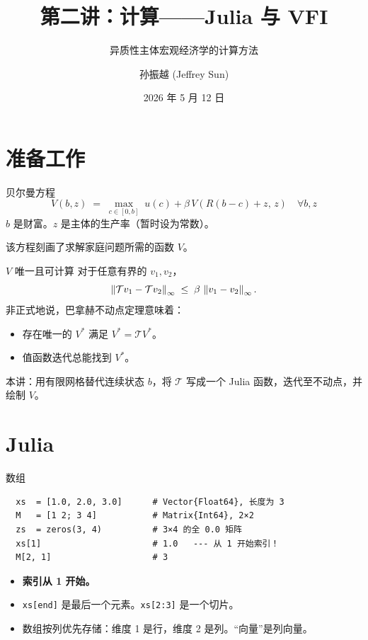 \documentclass[10pt,aspectratio=169]{beamer}
\title{第二讲：计算——Julia 与 VFI}
\subtitle{异质性主体宏观经济学的计算方法}
\author{孙振越 (Jeffrey Sun)}
\institute{多伦多大学}
\date{2026 年 5 月 12 日}
\begin{document}
\maketitle

\section{准备工作}

\begin{frame}{贝尔曼方程}
  \[
    \boxed{\;
      V(b, z) \;=\; \max_{c \in [0, b]} \; u(c)
        + \beta \, V(R(b-c) + z,\, z)\quad\forall b,z
    \;}
  \]
  $b$ 是财富。$z$ 是主体的生产率（暂时设为常数）。

  该方程刻画了求解家庭问题所需的函数 $V$。
\end{frame}

\begin{frame}{$V$ 唯一且可计算}
  对于任意有界的 $v_1, v_2$，
  \[
    \left\| \mathcal{T} v_1 - \mathcal{T} v_2 \right\|_\infty
      \;\le\; \beta \, \left\| v_1 - v_2 \right\|_\infty.
  \]
  非正式地说，巴拿赫不动点定理意味着：
  \begin{itemize}
    \item 存在唯一的 $V^*$ 满足 $V^* = \mathcal{T} V^*$。
    \item 值函数迭代总能找到 $V^*$。
  \end{itemize}
  本讲：用有限网格替代连续状态 $b$，将 $\mathcal{T}$ 写成一个 Julia 函数，迭代至不动点，并绘制 $V$。
\end{frame}

\section{Julia}

\begin{frame}[fragile]{数组}
  \begin{lstlisting}
  xs  = [1.0, 2.0, 3.0]      # Vector{Float64}, 长度为 3
  M   = [1 2; 3 4]           # Matrix{Int64}, 2×2
  zs  = zeros(3, 4)          # 3×4 的全 0.0 矩阵
  xs[1]                      # 1.0   --- 从 1 开始索引！
  M[2, 1]                    # 3
  \end{lstlisting}
  \begin{itemize}
    \item \textbf{索引从 1 开始。}
    \item \texttt{xs[end]} 是最后一个元素。\texttt{xs[2:3]} 是一个切片。
    \item 数组按列优先存储：维度 1 是行，维度 2 是列。``向量''是列向量。
  \end{itemize}
\end{frame}
\end{document}
